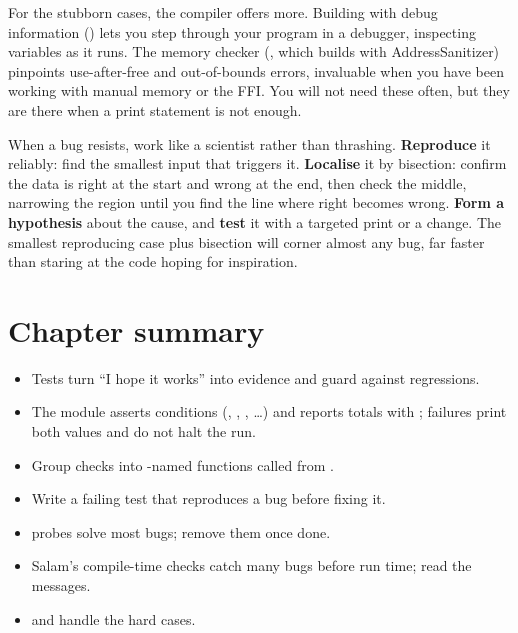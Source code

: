 For the stubborn cases, the compiler offers more. Building with debug information
() lets you step through your program in a debugger, inspecting
variables as it runs. The memory checker (, which builds
with AddressSanitizer) pinpoints use-after-free and out-of-bounds errors,
invaluable when you have been working
with manual memory or the FFI. You will not need these often, but they are there
when a print statement is not enough.

\begin{deep}
When a bug resists, work like a scientist rather than thrashing. \textbf{Reproduce}
it reliably: find the smallest input that triggers it. \textbf{Localise} it by
bisection: confirm the data is right at the start and wrong at the end, then check
the middle, narrowing the region until you find the line where right becomes wrong.
\textbf{Form a hypothesis} about the cause, and \textbf{test} it with a targeted
print or a change. The smallest reproducing case plus bisection will corner almost
any bug, far faster than staring at the code hoping for inspiration.
\end{deep}

\section{Chapter summary}

\begin{itemize}[leftmargin=1.4em]
  \item Tests turn ``I hope it works'' into evidence and guard against
        regressions.
  \item The  module asserts conditions (,
        , , \dots) and reports totals with
        ; failures print both values and do not halt the run.
  \item Group checks into -named functions called from .
  \item Write a failing test that reproduces a bug before fixing it.
  \item {} probes solve most bugs; remove them once done.
  \item Salam's compile-time checks catch many bugs before run time; read the
        messages.
  \item {} and  handle the hard cases.
\end{itemize}

